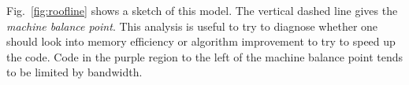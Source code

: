Fig.~\ref{fig:roofline} shows a sketch of this model. The vertical
dashed line gives the {\it machine balance point}.
This analysis is useful to try to diagnose whether one should look into
memory efficiency or algorithm improvement to try to speed up the code.
Code in the purple region to the left of the machine balance point
tends to be limited by bandwidth.






